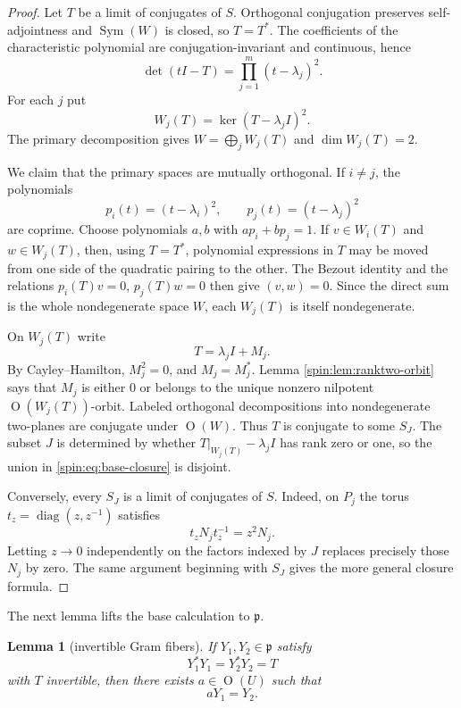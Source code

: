 \documentclass[10pt,a4paper]{amsart}
\numberwithin{equation}{section}
\newtheorem{lemma}[theorem]{Lemma}
\newcommand{\Or}{\operatorname{O}}
\newcommand{\Sym}{\operatorname{Sym}}
\newcommand{\diag}{\operatorname{diag}}
\newcommand{\fp}{\mathfrak p}
\begin{document}
\begin{proof}
Let $T$ be a limit of conjugates of $S$.  Orthogonal conjugation preserves
self-adjointness and $\Sym(W)$ is closed, so $T=T^*$.  The coefficients of
the characteristic polynomial are conjugation-invariant and continuous, hence
\begin{equation}\label{spin:eq:charpoly}
  \det(tI-T)=\prod_{j=1}^m(t-\lambda_j)^2.
\end{equation}
For each $j$ put
\[
  W_j(T)=\ker(T-\lambda_jI)^2.
\]
The primary decomposition gives
$W=\bigoplus_jW_j(T)$ and $\dim W_j(T)=2$.

We claim that the primary spaces are mutually orthogonal.  If $i\ne j$, the
polynomials
\[
  p_i(t)=(t-\lambda_i)^2,
  \qquad
  p_j(t)=(t-\lambda_j)^2
\]
are coprime.  Choose polynomials $a,b$ with $ap_i+bp_j=1$.  If
$v\in W_i(T)$ and $w\in W_j(T)$, then, using $T=T^*$, polynomial expressions
in $T$ may be moved from one side of the quadratic pairing to the other.  The
Bezout identity and the relations $p_i(T)v=0$, $p_j(T)w=0$ then give
$(v,w)=0$.  Since the direct sum is the whole nondegenerate space $W$, each
$W_j(T)$ is itself nondegenerate.

On $W_j(T)$ write
\[
  T=\lambda_jI+M_j.
\]
By Cayley--Hamilton, $M_j^2=0$, and $M_j=M_j^*$.  Lemma
\ref{spin:lem:ranktwo-orbit} says that $M_j$ is either $0$ or belongs to the unique
nonzero nilpotent $\Or(W_j(T))$-orbit.  Labeled orthogonal decompositions into
nondegenerate two-planes are conjugate under $\Or(W)$.  Thus $T$ is conjugate
to some $S_J$.  The subset $J$ is determined by whether
$T|_{W_j(T)}-\lambda_jI$ has rank zero or one, so the union in
\eqref{spin:eq:base-closure} is disjoint.

Conversely, every $S_J$ is a limit of conjugates of $S$.  Indeed, on $P_j$ the
torus $t_z=\diag(z,z^{-1})$ satisfies
\[
  t_zN_jt_z^{-1}=z^2N_j.
\]
Letting $z\to0$ independently on the factors indexed by $J$ replaces precisely
those $N_j$ by zero.  The same argument beginning with $S_J$ gives the more
general closure formula.
\end{proof}

The next lemma lifts the base calculation to $\fp$.

\begin{lemma}[invertible Gram fibers]\label{spin:lem:gram-fiber}
If $Y_1,Y_2\in\fp$ satisfy
\[
  Y_1^*Y_1=Y_2^*Y_2=T
\]
with $T$ invertible, then there exists $a\in\Or(U)$ such that
\[
  aY_1=Y_2.
\]
\end{lemma}
\end{document}
